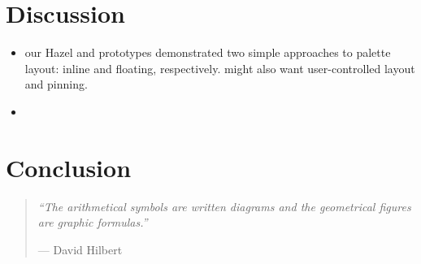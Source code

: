 \documentclass[acmsmall,review,anonymous,nonacm]{acmart}
\newcommand{\Hazel}{\textsf{Hazel}\xspace}
\theoremstyle{slplain}
\numberwithin{thm}{section}
\begin{document}
\section{Discussion}


\begin{itemize}

\item
%
our \Hazel{} and \sns{} prototypes demonstrated two simple approaches to palette
layout: inline and floating, respectively.
%
might also want user-controlled layout and pinning.

\end{itemize}


\begin{itemize}

\item \cite{SSS}

\end{itemize}

\section{Conclusion}

\begin{quote}
%
\textit{
%
``The arithmetical symbols are written diagrams and the geometrical figures are graphic formulas.''
%
}

\vspace{3pt}

\hfill{}--- David Hilbert~\cite{XXX}
\end{quote}





\clearpage
\appendix

\end{document}
